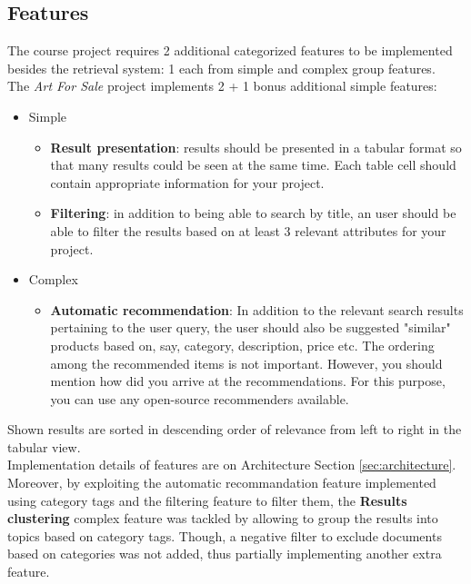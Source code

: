 \documentclass[12pt]{spieman}  %
\begin{document}
\begin{spacing}{1}
    \subsection{Features}
    The course project requires 2 additional categorized features to be implemented besides
    the retrieval system:
    1 each from simple and complex group features.\\
    The \textit{Art For Sale} project implements 2 + 1 bonus additional simple features:

    \begin{itemize}
        \item Simple
              \begin{itemize}
                  \item \textbf{Result presentation}:
                        results should be presented in a tabular format so that many results could be
                        seen at the same time.
                        Each table cell should contain appropriate information for your project.
                  \item \textbf{Filtering}:
                        in addition to being able to search by title, an user should be able to filter the
                        results based on at least 3 relevant attributes for your project.
              \end{itemize}
        \item Complex
              \begin{itemize}
                  \item \textbf{Automatic recommendation}:
                        In addition to the relevant search results pertaining to the user query,
                        the user should also be suggested "similar" products based on, say,
                        category, description, price etc.
                        The ordering among the recommended items is not important.
                        However, you should mention how did you arrive at the recommendations.
                        For this purpose, you can use any open-source recommenders available.
              \end{itemize}
    \end{itemize}

    Shown results are sorted in descending order of relevance from left to right in the tabular view.\\
    Implementation details of features are on Architecture Section \ref{sec:architecture}.\\
    Moreover, by exploiting the automatic recommandation feature implemented using category tags
    and the filtering feature to filter them,
    the \textbf{Results clustering} complex feature was tackled by allowing to group the results
    into topics based on category tags.
    Though, a negative filter to exclude documents based on categories was not added,
    thus partially implementing another extra feature.\\


\end{spacing}
\end{document}

